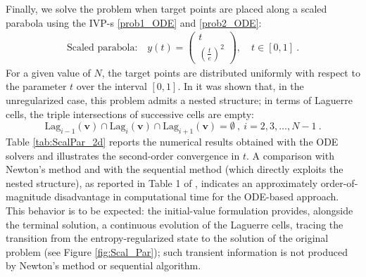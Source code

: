 \documentclass{scrartcl}
\theoremstyle{plain}
\theoremstyle{definition}
\newcommand{\icol}[1]{%
  \left(\begin{smallmatrix}#1\end{smallmatrix}\right)%
}
\begin{document}
Finally, we solve the problem when target points are placed along a scaled parabola using the IVP-s \eqref{prob1_ODE} and \eqref{prob2_ODE}:
\begin{gather*}
    \text{Scaled parabola:} \quad y(t) = \icol{t \\ \left(\frac{t}{e}\right)^2}, \quad t \in [0, 1]\ .
\end{gather*}
For a given value of $N$, the target points are distributed uniformly with respect to the parameter $t$ over the interval $[0,1]$. In \cite{halim2025_SDM21D} it was shown that, in the unregularized case, this problem admits a nested structure; in terms of Laguerre cells, the triple intersections of successive cells are empty:
\[
    \mathrm{Lag}_{i-1}(\mathbf{v}) \cap \mathrm{Lag}_i(\mathbf{v}) \cap \mathrm{Lag}_{i+1}(\mathbf{v}) = \emptyset\ , \ i=2,3,\dots, N-1\ .
\]
Table \ref{tab:ScalPar_2d} reports the numerical results obtained with the ODE solvers and illustrates the second-order convergence in $t$. A comparison with Newton's method and with the sequential method (which directly exploits the nested structure), as reported in Table 1 of \cite{halim2025_SDM21D}, indicates an approximately order-of-magnitude disadvantage in computational time for the ODE-based approach. This behavior is to be expected: the initial-value formulation provides, alongside the terminal solution, a continuous evolution of the Laguerre cells, tracing the transition from the entropy-regularized state to the solution of the original problem (see Figure \ref{fig:Scal_Par}); such transient information is not produced by Newton's method or sequential algorithm.
\end{document}
